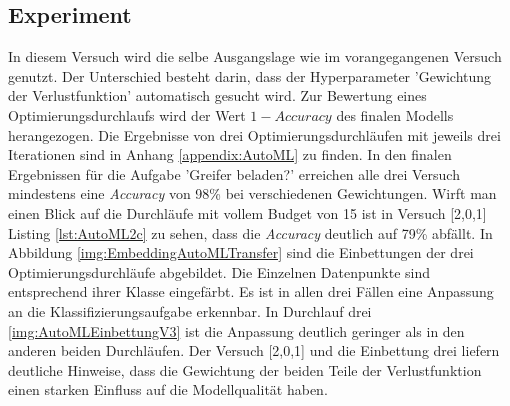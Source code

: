 	\subsection{Experiment}
	\label{subsec:AutoMLExperiment}
	In diesem Versuch wird die selbe Ausgangslage wie im vorangegangenen Versuch genutzt. Der Unterschied besteht darin, dass der Hyperparameter 'Gewichtung der Verlustfunktion' automatisch gesucht wird. Zur Bewertung eines Optimierungsdurchlaufs wird der Wert $1 - Accuracy$ des finalen Modells herangezogen. Die Ergebnisse von drei Optimierungsdurchläufen mit jeweils drei Iterationen sind in Anhang \ref{appendix:AutoML} zu finden. In den finalen Ergebnissen für die Aufgabe 'Greifer beladen?' erreichen alle drei Versuch mindestens eine \textit{Accuracy} von 98\% bei verschiedenen Gewichtungen.  Wirft man einen Blick auf die Durchläufe mit vollem Budget von 15 ist in Versuch [2,0,1] Listing \ref{lst:AutoML2c} zu sehen, dass die \textit{Accuracy} deutlich auf 79\% abfällt. In Abbildung \ref{img:EmbeddingAutoMLTransfer} sind die Einbettungen der drei Optimierungsdurchläufe abgebildet. Die Einzelnen Datenpunkte sind entsprechend ihrer Klasse eingefärbt. Es ist in allen drei Fällen eine Anpassung an die Klassifizierungsaufgabe erkennbar. In Durchlauf drei \ref{img:AutoMLEinbettungV3} ist die Anpassung deutlich geringer als in den anderen beiden Durchläufen. Der Versuch [2,0,1] und die Einbettung drei liefern deutliche Hinweise, dass die Gewichtung der beiden Teile der Verlustfunktion einen starken Einfluss auf die Modellqualität haben. 
	
